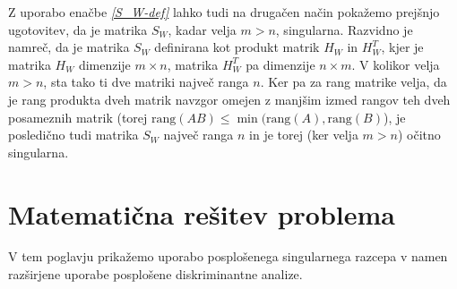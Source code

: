 \documentclass[mat1]{article}
\theoremstyle{definition}
\begin{document}
Z uporabo enačbe \textit{\eqref{S_W-def}} lahko tudi na drugačen način pokažemo prejšnjo ugotovitev, da je matrika $S_W$, kadar velja $m>n$, singularna. Razvidno je namreč, da je matrika $S_W$ definirana kot produkt matrik $H_W$ in $H_W^T$, kjer je matrika $H_W$ dimenzije $m \times n$, matrika $H_W^T$ pa dimenzije $n \times m$. V kolikor velja $m>n$, sta tako ti dve matriki največ ranga $n$.
Ker pa za rang matrike velja, da je rang produkta dveh matrik navzgor omejen z manjšim izmed rangov teh dveh posameznih matrik (torej $\text{rang}(AB) \leq \min(\text{rang}(A), \text{rang}(B)$), je posledično tudi matrika $S_W$ največ ranga $n$ in je torej (ker velja $m > n$) očitno singularna.


\section{Matematična rešitev problema}
V tem poglavju prikažemo uporabo posplošenega singularnega razcepa v namen razširjene uporabe posplošene diskriminantne analize.
 
\end{document}
